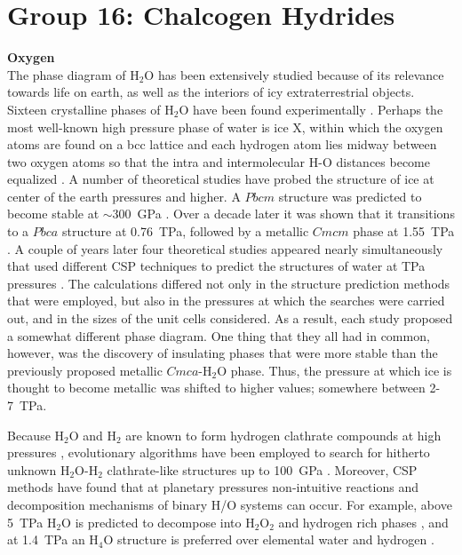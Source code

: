 \documentclass[12pt,letterpaper,oneside]{article}
\begin{document}
 

\section{Group 16: Chalcogen Hydrides}

\noindent\textbf{Oxygen} \\ 
%
The phase diagram of H$_2$O has been extensively studied because of its relevance towards life on earth, as well as the interiors of icy extraterrestrial objects. Sixteen crystalline phases of H$_2$O have been found experimentally \cite{Petrenko}. Perhaps the most well-known high pressure phase of water is ice X, within which the oxygen atoms are found on a bcc lattice and each hydrogen atom lies midway between two oxygen atoms so that the intra and intermolecular H-O distances become equalized \cite{Loubeyre:1999a}. A number of theoretical studies have probed the structure of ice at center of the earth pressures and higher. A $Pbcm$ structure was predicted to become stable at $\sim$300~GPa \cite{Benoit:1996}. Over a decade later it was shown that it transitions to a $Pbca$ structure at 0.76~TPa, followed by a metallic $Cmcm$ phase at 1.55~TPa \cite{Militzer:2010}. A couple of years later four theoretical studies appeared nearly simultaneously that used different CSP techniques to predict the structures of water at TPa pressures \cite{Wang:2011a,Hermann:2012a,Ji:2011a,McMahon:2011c}. The calculations differed not only in the structure prediction methods that were employed, but also in the pressures at which the searches were carried out, and in the sizes of the unit cells considered. As a result, each study proposed a somewhat different phase diagram. One thing that they all had in common, however, was the discovery of insulating phases that were more stable than the previously proposed metallic $Cmca$-H$_2$O phase. Thus, the pressure at which ice is thought to become metallic was shifted to higher values; somewhere between 2-7~TPa. 

Because H$_2$O and H$_2$ are known to form hydrogen clathrate compounds at high pressures \cite{Vos:1993a}, evolutionary algorithms have been employed to search for hitherto unknown H$_2$O-H$_2$ clathrate-like structures up to 100~GPa \cite{Qian:2014a}. Moreover, CSP methods have found that at planetary pressures non-intuitive reactions and decomposition mechanisms of binary H/O systems can occur. For example, above 5~TPa H$_2$O is predicted to decompose into H$_2$O$_2$ and hydrogen rich phases \cite{Pickard:H2O}, and at 1.4~TPa an H$_4$O structure is preferred over elemental water and hydrogen \cite{Zhang:2013a}. \\
\end{document}
